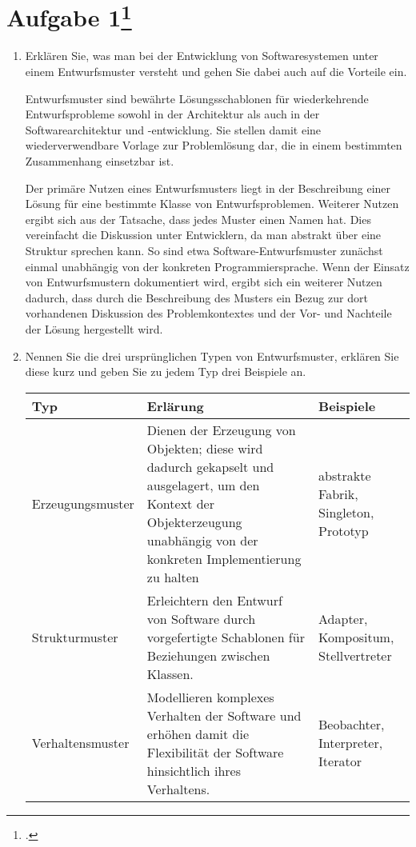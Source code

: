 \documentclass{lehramt-informatik}
\begin{document}
\section{Aufgabe 1\footcite{sosy:ab:6}}

\begin{enumerate}


\item Erklären Sie, was man bei der Entwicklung von Softwaresystemen
unter einem Entwurfsmuster versteht und gehen Sie dabei auch auf die
Vorteile ein.

\begin{antwort}
Entwurfsmuster sind bewährte Lösungsschablonen für wiederkehrende
Entwurfsprobleme sowohl in der Architektur als auch in der
Softwarearchitektur und -entwicklung. Sie stellen damit eine
wiederverwendbare Vorlage zur Problemlösung dar, die in einem bestimmten
Zusammenhang einsetzbar ist.

Der primäre Nutzen eines Entwurfsmusters liegt in der Beschreibung einer
Lösung für eine bestimmte Klasse von Entwurfsproblemen. Weiterer Nutzen
ergibt sich aus der Tatsache, dass jedes Muster einen Namen hat. Dies
vereinfacht die Diskussion unter Entwicklern, da man abstrakt über eine
Struktur sprechen kann. So sind etwa Software-Entwurfsmuster zunächst
einmal unabhängig von der konkreten Programmiersprache. Wenn der Einsatz
von Entwurfsmustern dokumentiert wird, ergibt sich ein weiterer Nutzen
dadurch, dass durch die Beschreibung des Musters ein Bezug zur dort
vorhandenen Diskussion des Problemkontextes und der Vor- und Nachteile
der Lösung hergestellt wird.
\end{antwort}


\item Nennen Sie die drei ursprünglichen Typen von Entwurfsmuster,
erklären Sie diese kurz und geben Sie zu jedem Typ drei Beispiele an.

\begin{antwort}

\begin{tabularx}{\linewidth}{p{2cm}|X|p{2cm}}
\textbf{Typ} & \textbf{Erlärung} & \textbf{Beispiele} \\\hline\hline

Erzeugungsmuster &
Dienen der Erzeugung von Objekten; diese wird dadurch gekapselt und
ausgelagert, um den Kontext der Objekterzeugung unabhängig von der
konkreten Implementierung zu halten &
abstrakte Fabrik, Singleton, Prototyp \\\hline

Strukturmuster &
Erleichtern den Entwurf von Software durch vorgefertigte Schablonen für
Beziehungen zwischen Klassen. &
Adapter, Kompositum, Stellvertreter \\\hline

Verhaltensmuster  &
Modellieren komplexes Verhalten der Software und erhöhen damit die
Flexibilität der Software hinsichtlich ihres Verhaltens. &
Beobachter, Interpreter, Iterator \\
\end{tabularx}
\end{antwort}
\end{enumerate}
\end{document}
